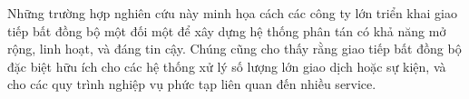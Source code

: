 Những trường hợp nghiên cứu này minh họa cách các công ty lớn triển khai giao tiếp bất đồng bộ một đối một để xây dựng hệ thống phân tán có khả năng mở rộng, linh hoạt, và đáng tin cậy. Chúng cũng cho thấy rằng giao tiếp bất đồng bộ đặc biệt hữu ích cho các hệ thống xử lý số lượng lớn giao dịch hoặc sự kiện, và cho các quy trình nghiệp vụ phức tạp liên quan đến nhiều service.